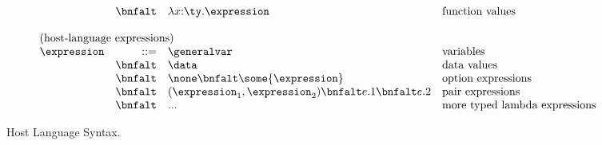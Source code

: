 \begin{figure*}[t]
\[\begin{array}{lrll}
& \bnfalt & \lambda x{:}\ty.\expression & \mbox{function values} \\
\\
\multicolumn{4}{l}{\mbox{(host-language expressions)}}\\ 
\expression & ::= & \generalvar & \mbox{variables} \\
 & \bnfalt & \data & \mbox{data values} \\
 & \bnfalt & \none \bnfalt 
              \some{\expression} & \mbox{option expressions}\\
 & \bnfalt & (\expression_1,\expression_2) \bnfalt e.1 \bnfalt e.2 
    & \mbox{pair expressions} \\
 & \bnfalt & ... & \mbox{more typed lambda expressions} \\
\end{array}
\]
\caption{Host Language Syntax.}
\label{fig:host-language}
\end{figure*}

